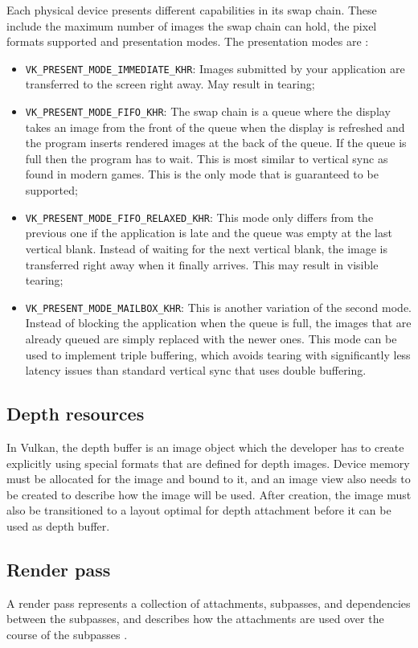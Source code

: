 Each physical device presents different capabilities in its swap chain. These include the maximum number of images the swap chain can hold, the pixel formats supported and presentation modes. The presentation modes are \cite{vulkan_tutorial}:
\begin{itemize}
    \item \texttt{VK\_PRESENT\_MODE\_IMMEDIATE\_KHR}: Images submitted by your application are transferred to the screen right away. May result in tearing;
    \item \texttt{VK\_PRESENT\_MODE\_FIFO\_KHR}: The swap chain is a queue where the display takes an image from the front of the queue when the display is refreshed and the program inserts rendered images at the back of the queue. If the queue is full then the program has to wait. This is most similar to vertical sync as found in modern games. This is the only mode that is guaranteed to be supported;
    \item \texttt{VK\_PRESENT\_MODE\_FIFO\_RELAXED\_KHR}: This mode only differs from the previous one if the application is late and the queue was empty at the last vertical blank. Instead of waiting for the next vertical blank, the image is transferred right away when it finally arrives. This may result in visible tearing;
    \item \texttt{VK\_PRESENT\_MODE\_MAILBOX\_KHR}: This is another variation of the second mode. Instead of blocking the application when the queue is full, the images that are already queued are simply replaced with the newer ones. This mode can be used to implement triple buffering, which avoids tearing with significantly less latency issues than standard vertical sync that uses double buffering.
\end{itemize}

\subsection{Depth resources}
In Vulkan, the depth buffer is an image object which the developer has to create explicitly using special formats that are defined for depth images. Device memory must be allocated for the image and bound to it, and an image view also needs to be created to describe how the image will be used. After creation, the image must also be transitioned to a layout optimal for depth attachment before it can be used as depth buffer.

\subsection{Render pass}
A render pass represents a collection of attachments, subpasses, and dependencies between the subpasses, and describes how the attachments are used over the course of the subpasses \cite{vulkan_docs}.

